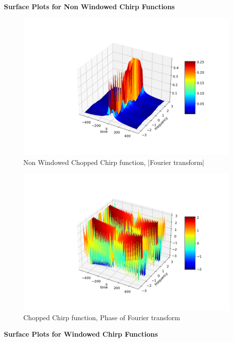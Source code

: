 \documentclass[11pt, a4paper]{article}
\begin{document}
\noindent
\textbf{
Surface Plots for Non Windowed Chirp Functions}

\begin{figure}[!tbh]
\centering
\includegraphics[scale=0.4]{plots/non_windowed_surfacemag.png}
\caption{Non Windowed Chopped Chirp function, |Fourier transform|}
\label{fig:14}
\end{figure}

\begin{figure}[!tbh]
\centering
\includegraphics[scale=0.4]{plots/non_windowed_surfaceangles.png}
\caption{Chopped Chirp function, Phase of Fourier transform}
\label{fig:15}
\end{figure}
\newpage

\noindent
\textbf{
Surface Plots for Windowed Chirp Functions}
\end{document}
